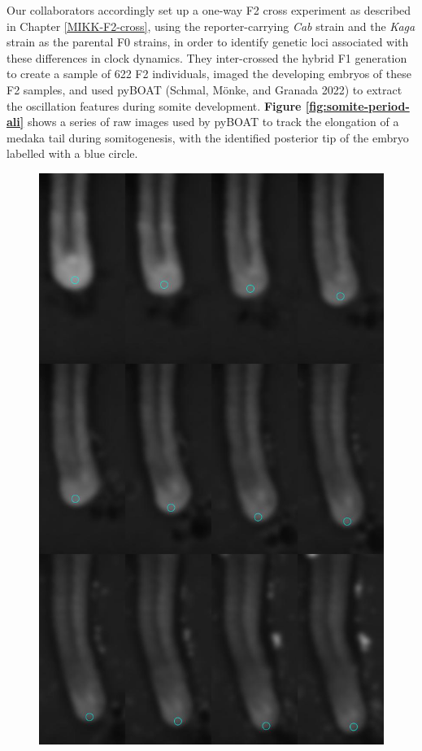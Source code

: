 \documentclass[
]{book}
\begin{document}
Our collaborators accordingly set up a one-way F2 cross experiment as described in Chapter \ref{MIKK-F2-cross}, using the reporter-carrying \emph{Cab} strain and the \emph{Kaga} strain as the parental F0 strains, in order to identify genetic loci associated with these differences in clock dynamics. They inter-crossed the hybrid F1 generation to create a sample of 622 F2 individuals, imaged the developing embryos of these F2 samples, and used pyBOAT (Schmal, Mönke, and Granada 2022) to extract the oscillation features during somite development. \textbf{Figure \ref{fig:somite-period-ali}} shows a series of raw images used by pyBOAT to track the elongation of a medaka tail during somitogenesis, with the identified posterior tip of the embryo labelled with a blue circle.



\begin{figure}

\includegraphics[width=1\linewidth]{figs/somites/ali_compiled_somite_elong} \hfill{}


\end{figure}
\end{document}
